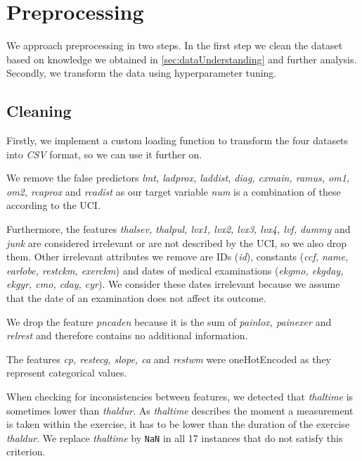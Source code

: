 \section{Preprocessing} \label{sec:preprocessing}

We approach preprocessing in two steps. In the first step we clean the dataset based on knowledge we obtained in \cref{sec:dataUnderstanding} and further analysis. 
Secondly, we transform the data using hyperparameter tuning.

\subsection{Cleaning}
Firstly, we implement a custom loading function to transform the four datasets into \emph{CSV} format, so we can use it further on.

We remove the false predictors \emph{lmt, ladprox, laddist, diag, cxmain, ramus, om1, om2, rcaprox} and \emph{rcadist}  as our target variable \emph{num} is a combination of these according to the UCI. %

Furthermore, the features \emph{thalsev, thalpul, lvx1, lvx2, lvx3, lvx4, lvf, dummy} and \emph{junk} are considered irrelevant or are not described by the UCI, so we also drop them. Other irrelevant attributes we remove are IDs (\emph{id}), constants (\emph{ccf, name, earlobe, restckm, exerckm}) and dates of medical examinations (\emph{ekgmo, ekgday, ekgyr, cmo, cday, cyr}). We consider these dates irrelevant because we assume that the date of  an examination does not affect its outcome. 

We drop the feature \emph{pncaden} because it is the sum of \emph{painlox, painexer} and \emph{relrest} and therefore contains no additional information. 

The features \emph{cp, restecg, slope, ca} and \emph{restwm} were oneHotEncoded as they represent categorical values.

When checking for inconsistencies between features, we detected that \emph{thaltime} is sometimes lower than \emph{thaldur}. As \emph{thaltime} describes the moment a measurement is taken within the exercise, it has to be lower than the duration of the exercise \emph{thaldur}. We replace \emph{thaltime} by \texttt{NaN} in all 17 instances that do not satisfy this criterion. 

